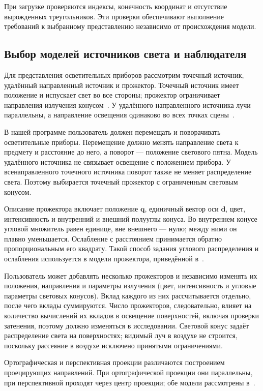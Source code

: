 При загрузке проверяются индексы, конечность координат и отсутствие вырожденных треугольников. Эти проверки обеспечивают выполнение требований к выбранному представлению независимо от происхождения модели.

\subsection{Выбор моделей источников света и наблюдателя}
\label{subsec:lights}

Для представления осветительных приборов рассмотрим точечный источник, удалённый направленный источник и прожектор. Точечный источник имеет положение и испускает свет во все стороны; прожектор ограничивает направления излучения конусом~\cite[разд.~12.2]{pbrt4}. У удалённого направленного источника лучи параллельны, а направление освещения одинаково во всех точках сцены~\cite[разд.~12.3]{pbrt4}.

В нашей программе пользователь должен перемещать и поворачивать осветительные приборы. Перемещение должно менять направление света к предмету и расстояние до него, а поворот --- положение светового пятна. Модель удалённого источника не связывает освещение с положением прибора. У всенаправленного точечного источника поворот также не меняет распределение света. Поэтому выбирается точечный прожектор с ограниченным световым конусом.

Описание прожектора включает положение $\mathbf q$, единичный вектор оси $\mathbf d$, цвет, интенсивность и внутренний и внешний полууглы конуса. Во внутреннем конусе угловой множитель равен единице, вне внешнего --- нулю; между ними он плавно уменьшается. Ослабление с расстоянием принимается обратно пропорциональным его квадрату. Такой способ задания углового распределения и ослабления используется в модели прожектора, приведённой в~\cite[разд.~12.2.1]{pbrt4}.

Пользователь может добавлять несколько прожекторов и независимо изменять их положения, направления и параметры излучения (цвет, интенсивность и угловые параметры световых конусов). Вклад каждого из них рассчитывается отдельно, после чего вклады суммируются. Число прожекторов, следовательно, влияет на количество вычислений их вкладов в освещение поверхностей, включая проверки затенения, поэтому должно изменяться в исследовании. Световой конус задаёт распределение света на поверхностях; видимый луч в воздухе не строится, поскольку рассеяние в воздухе исключено принятыми ограничениями.

Ортографическая и перспективная проекции различаются построением проецирующих направлений. При ортографической проекции они параллельны, при перспективной проходят через центр проекции; обе модели рассмотрены в~\cite[разд.~5.2]{pbrt4}.

